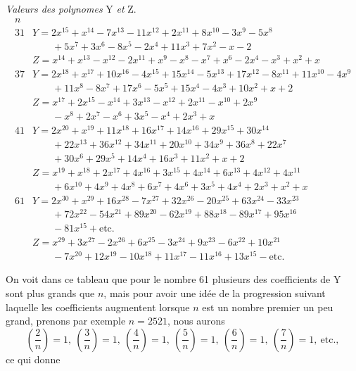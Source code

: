\documentclass[11pt,a4paper]{article}
\begin{document}
\textit{Valeurs des polynomes} Y \textit{et} Z.
\[
\begin{array}{r|l}
n & \\ \hline
31 & Y = 2x^{15} + x^{14} - 7x^{13} - 11x^{12} + 2x^{11} + 8x^{10} - 3x^9 - 5x^8 \\
   & \qquad + 5x^7 + 3x^6 - 8x^5 - 2x^4 + 11x^3 + 7x^2 - x - 2 \\
   & Z = x^{14} + x^{13} - x^{12} - 2x^{11} + x^9 - x^8 - x^7 + x^6 - 2x^4 - x^3 + x^2 + x \\ \hline
37 & Y = 2x^{18} + x^{17} + 10x^{16} - 4x^{15} + 15x^{14} - 5x^{13} + 17x^{12} - 8x^{11} + 11x^{10} - 4x^9 \\
   & \qquad + 11x^8 - 8x^7 + 17x^6 - 5x^5 + 15x^4 - 4x^3 + 10x^2 + x + 2 \\
   & Z = x^{17} + 2x^{15} - x^{14} + 3x^{13} - x^{12} + 2x^{11} - x^{10} + 2x^9 \\
   & \qquad - x^8 + 2x^7 - x^6 + 3x^5 - x^4 + 2x^3 + x \\ \hline
41 & Y = 2x^{20} + x^{19} + 11x^{18} + 16x^{17} + 14x^{16} + 29x^{15} + 30x^{14} \\
   & \qquad + 22x^{13} + 36x^{12} + 34x^{11} + 20x^{10} + 34x^9 + 36x^8 + 22x^7 \\
   & \qquad + 30x^6 + 29x^5 + 14x^4 + 16x^3 + 11x^2 + x + 2 \\
   & Z = x^{19} + x^{18} + 2x^{17} + 4x^{16} + 3x^{15} + 4x^{14} + 6x^{13} + 4x^{12} + 4x^{11} \\
   & \qquad + 6x^{10} + 4x^9 + 4x^8 + 6x^7 + 4x^6 + 3x^5 + 4x^4 + 2x^3 + x^2 + x \\ \hline
61 & Y = 2x^{30} + x^{29} + 16x^{28} - 7x^{27} + 32x^{26} - 20x^{25} + 63x^{24} - 33x^{23} \\
   & \qquad + 72x^{22} - 54x^{21} + 89x^{20} - 62x^{19} + 88x^{18} - 89x^{17} + 95x^{16} \\
   & \qquad - 81x^{15} + \text{etc.} \\
   & Z = x^{29} + 3x^{27} - 2x^{26} + 6x^{25} - 3x^{24} + 9x^{23} - 6x^{22} + 10x^{21} \\
   & \qquad - 7x^{20} + 12x^{19} - 10x^{18} + 11x^{17} - 11x^{16} + 13x^{15} - \text{etc.}
\end{array}
\]

On voit dans ce tableau que pour le nombre 61 plusieurs des coefficients
de Y sont plus grands que $n$, mais pour avoir une idée de la progression
suivant laquelle les coefficients augmentent lorsque $n$ est un nombre
premier un peu grand, prenons par exemple $n = 2521$, nous aurons
\[
\left(\frac{2}{n}\right) = 1,\ \left(\frac{3}{n}\right) = 1,\ \left(\frac{4}{n}\right) = 1,\ \left(\frac{5}{n}\right) = 1,\ \left(\frac{6}{n}\right) = 1,\ \left(\frac{7}{n}\right) = 1,\ \text{etc.},
\]
ce qui donne
\end{document}
